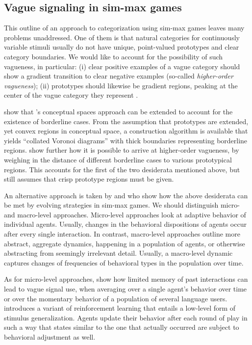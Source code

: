 \documentclass[fleqn,reqno,10pt]{article}
\begin{document}
\subsection{Vague signaling in sim-max games}

This outline of an approach to categorization using sim-max games
leaves many problems unaddressed. One of them is that natural
categories for continuously variable stimuli usually do not have
unique, point-valued prototypes and clear category boundaries. We
would like to account for the possibility of such vagueness, in
particular: (i) clear positive examples of
a vague category should show a gradient transition to clear negative
examples (so-called \emph{higher-order vagueness}); (ii) prototypes
should likewise be gradient regions, peaking at the center of the
vague category they represent
\citep[e.g.][]{Sainsbury1991:Is-There-Higher,KeefeSmith1997:Vagueness:-A-Re}.

\citet{DouvenDecock2011:Vagueness:-A-Co} show that
\citeauthor{Gardenfors2000:Conceptual-Spac}'s conceptual spaces
approach can be extended to account for the existence of borderline
cases. From the assumption that prototypes are extended, yet convex
regions in conceptual space, a construction algorithm is available that
yields ``collated Voronoi diagrams'' with thick boundaries
representing borderline
regions. \citet{DecockDouven2012:What-is-Graded-} show further how it
is possible to arrive at higher-order vagueness, by weighing in the
distance of different borderline cases to various prototypical
regions. This accounts for the first of the two desiderata mentioned
above, but still assumes that crisp prototype regions must be
given.

An alternative approach is taken by
\citet{FrankeJager2010:Vagueness-Signa} and
\citet{OConnor2013:The-Evolution-o} who show how the above desiderata
can be met by evolving strategies in sim-max games. We should
distinguish micro- and macro-level approaches. Micro-level approaches
look at adaptive behavior of individual agents. Usually, changes in
the behavioral dispositions of agents occur after every single
interaction. In contrast, macro-level approaches outline more
abstract, aggregate dynamics, happening in a population of agents, or
otherwise abstracting from seemingly irrelevant detail. Usually, a
macro-level dynamic captures changes of frequencies of behavioral
types in the population over time.

As for micro-level approaches, \citet{FrankeJager2010:Vagueness-Signa}
show how limited memory of past interactions can lead to vague signal
use, when averaging over a single agent's behavior over time or over
the momentary behavior of a population of several language
users. \citet{OConnor2013:The-Evolution-o} introduces a variant of
reinforcement learning that entails a low-level form of stimulus
generalization. Agents update their behavior after each round of play
in such a way that states similar to the one that actually occurred
are subject to behavioral adjustment as well.
\end{document}
